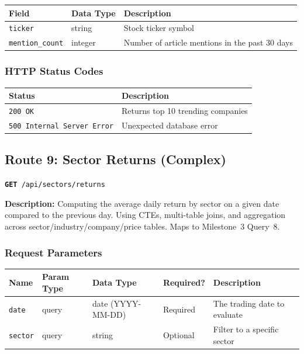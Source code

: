 \documentclass[11pt]{article}
\newcommand{\route}[2]{\texttt{\textcolor{routecolor}{\textbf{#1}}~#2}}
\begin{document}
\begin{center}
\small
\begin{tabular}{l l p{7cm}}
\toprule
\textbf{Field} & \textbf{Data Type} & \textbf{Description} \\
\midrule
\texttt{ticker}         & string  & Stock ticker symbol \\
\texttt{mention\_count} & integer & Number of article mentions in the past 30 days \\
\bottomrule
\end{tabular}
\end{center}

\subsubsection*{HTTP Status Codes}

\begin{center}
\small
\begin{tabular}{l p{8cm}}
\toprule
\textbf{Status} & \textbf{Description} \\
\midrule
\texttt{200 OK} & Returns top 10 trending companies \\
\texttt{500 Internal Server Error} & Unexpected database error \\
\bottomrule
\end{tabular}
\end{center}

\newpage
\subsection{Route 9: Sector Returns (Complex)}

\route{GET}{/api/sectors/returns}

\medskip\noindent
\textbf{Description:} Computing the average daily return by sector on a given date compared to the previous day. Using CTEs, multi-table joins, and aggregation across sector/industry/company/price tables. Maps to Milestone~3 Query~8.

\subsubsection*{Request Parameters}

\begin{center}
\small
\begin{tabular}{l l l l p{5cm}}
\toprule
\textbf{Name} & \textbf{Param Type} & \textbf{Data Type} & \textbf{Required?} & \textbf{Description} \\
\midrule
\texttt{date}   & query & date (YYYY-MM-DD) & Required & The trading date to evaluate \\
\texttt{sector} & query & string            & Optional & Filter to a specific sector \\
\bottomrule
\end{tabular}
\end{center}
\end{document}
